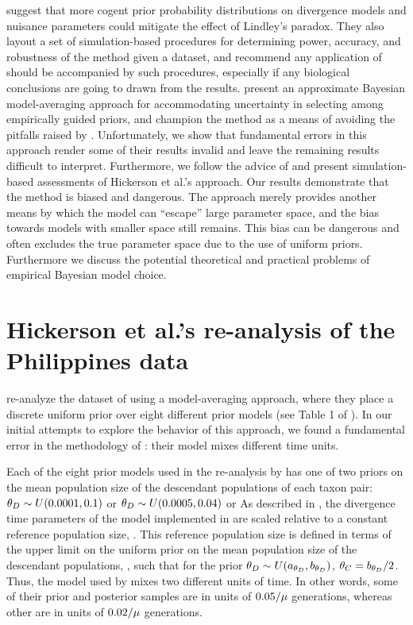 \documentclass[letterpaper,12pt]{article}
\begin{document}
\begin{linenumbers}
\citet{Oaks2012} suggest that more cogent prior probability distributions on
divergence models and nuisance parameters could mitigate the effect of
Lindley's paradox.
They also layout a set of simulation-based procedures for determining power,
accuracy, and robustness of the method given a dataset, and recommend any
application of \msb should be accompanied by such procedures, especially
if any biological conclusions are going to drawn from the results.
\citet{Hickerson2013} present an approximate Bayesian model-averaging approach
for accommodating uncertainty in selecting among empirically guided priors, and
champion the method as a means of avoiding the pitfalls raised by
\citet{Oaks2012}.
Unfortunately, we show that fundamental errors in this approach render some of
their results invalid and leave the remaining results difficult to interpret.
Furthermore, we follow the advice of \citet{Oaks2012} and present
simulation-based assessments of Hickerson et al.'s \citeyear{Hickerson2013}
approach.
Our results demonstrate that the method is biased and dangerous.
The approach merely provides another means by which the model can ``escape''
large parameter space, and the bias towards models with smaller space still
remains.
This bias can be dangerous and often excludes the true parameter space due to
the use of uniform priors.
Furthermore we discuss the potential theoretical and practical problems of
empirical Bayesian model choice.



\section*{Hickerson et al.'s re-analysis of the Philippines data}
\citet{Hickerson2013} re-analyze the dataset of \citet{Oaks2012} using a
model-averaging approach, where they place a discrete uniform prior over eight
different prior models (see Table 1 of \citet{Hickerson2013}).
In our initial attempts to explore the behavior of this approach, we found
a fundamental error in the methodology of \citet{Hickerson2013}:
their model mixes different time units.

Each of the eight prior models used in the re-analysis by \citet{Hickerson2013}
has one of two priors on the mean population size of the descendant populations
of each taxon pair:
$\meanDescendantTheta{} \sim U(0.0001, 0.1)$ or
$\meanDescendantTheta{} \sim U(0.0005, 0.04)$ or
As described in \citet{Oaks2012}, the divergence time parameters of the model
implemented in \msb are scaled relative to a constant reference population
size, .
This reference population size is defined in terms of the upper limit on the
uniform prior on the mean population size of the descendant populations,
\meanDescendantTheta{}, such that for the prior $\meanDescendantTheta{} \sim
U(\uniformMin{\meanDescendantTheta{}},\uniformMax{\meanDescendantTheta{}})$,
$\myTheta{C} = \uniformMax{\meanDescendantTheta{}}/2$.
Thus, the model used by \citet{Hickerson2013} mixes two different units of
time.
In other words, some of their prior and posterior samples are in units of
$0.05/\mu$ generations, whereas other are in units of
$0.02/\mu$ generations.


\end{linenumbers}
\end{document}
